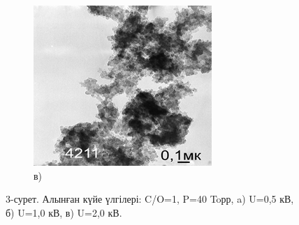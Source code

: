 \begin{figure}[H]
\begin{subfigure}[b]{0.32\textwidth}
        \centering
        \includegraphics[width=\textwidth]{assets/31}
        \caption*{в)}
    \end{subfigure}
    \caption*{3-сурет. Алынған күйе үлгілері: C/O=1, P=40 Toрр, a) U=0,5 кВ, б) U=1,0 кВ, в) U=2,0 кВ.}
\end{figure}

